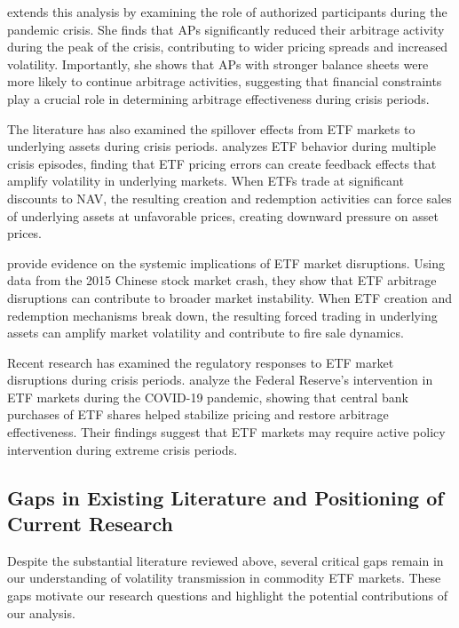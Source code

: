 \citet{dannhauser2020etf} extends this analysis by examining the role of authorized participants during the pandemic crisis. She finds that APs significantly reduced their arbitrage activity during the peak of the crisis, contributing to wider pricing spreads and increased volatility. Importantly, she shows that APs with stronger balance sheets were more likely to continue arbitrage activities, suggesting that financial constraints play a crucial role in determining arbitrage effectiveness during crisis periods.

The literature has also examined the spillover effects from ETF markets to underlying assets during crisis periods. \citet{staer2017asset} analyzes ETF behavior during multiple crisis episodes, finding that ETF pricing errors can create feedback effects that amplify volatility in underlying markets. When ETFs trade at significant discounts to NAV, the resulting creation and redemption activities can force sales of underlying assets at unfavorable prices, creating downward pressure on asset prices.

\citet{pan2017market} provide evidence on the systemic implications of ETF market disruptions. Using data from the 2015 Chinese stock market crash, they show that ETF arbitrage disruptions can contribute to broader market instability. When ETF creation and redemption mechanisms break down, the resulting forced trading in underlying assets can amplify market volatility and contribute to fire sale dynamics.

Recent research has examined the regulatory responses to ETF market disruptions during crisis periods. \citet{lynch2021market} analyze the Federal Reserve's intervention in ETF markets during the COVID-19 pandemic, showing that central bank purchases of ETF shares helped stabilize pricing and restore arbitrage effectiveness. Their findings suggest that ETF markets may require active policy intervention during extreme crisis periods.

\subsection{Gaps in Existing Literature and Positioning of Current Research}

Despite the substantial literature reviewed above, several critical gaps remain in our understanding of volatility transmission in commodity ETF markets. These gaps motivate our research questions and highlight the potential contributions of our analysis.

